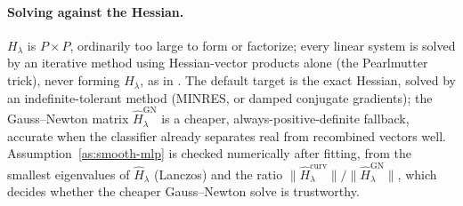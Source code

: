 \documentclass[11pt]{article}
\theoremstyle{plain}
\theoremstyle{definition}
\theoremstyle{remark}
\begin{document}
\paragraph{Solving against the Hessian.}
\label{sec:mcd-algorithm-mlp}
$H_\lambda$ is $P\times P$, ordinarily too large to form or factorize; every linear system is
solved by an iterative method using Hessian-vector products alone (the Pearlmutter trick),
never forming $\widehat H_\lambda$, as in \citet{kohliang2017}. The default target is the exact
Hessian, solved by an indefinite-tolerant method (MINRES, or damped conjugate gradients); the
Gauss--Newton matrix $\widehat H_\lambda^{\mathrm{GN}}$ is a cheaper, always-positive-definite
fallback, accurate when the classifier already separates real from recombined vectors well.
Assumption~\ref{as:smooth-mlp} is checked numerically after fitting, from the smallest
eigenvalues of $\widehat H_\lambda$ (Lanczos) and the ratio
$\|\widehat H_\lambda^{\mathrm{curv}}\|/\|\widehat H_\lambda^{\mathrm{GN}}\|$, which decides
whether the cheaper Gauss--Newton solve is trustworthy.
\end{document}

